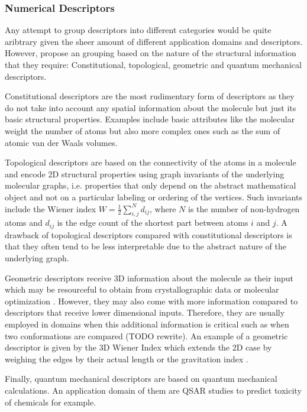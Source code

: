 \subsubsection{Numerical Descriptors}

Any attempt to group descriptors into different categories would be quite aribtrary given the sheer amount of different application domains and descriptors. However, \cite{descript} propose an grouping based on the nature of the structural information that they require: Constitutional, topological, geometric and quantum mechanical descriptors. 

Constitutional descriptors are the most rudimentary form of descriptors as they do not take into account any spatial information about the molecule but just its basic structural properties. Examples include basic attributes like the molecular weight the number of atoms but also more complex ones such as the sum of atomic van der Waals volumes. 

Topological descriptors are based on the connectivity of the atoms in a molecule and encode 2D structural properties using graph invariants of the underlying molecular graphs, i.e. properties that only depend on the abstract mathematical object and not on a particular labeling or ordering of the vertices. Such invariants include the Wiener index \cite{wiener1947structural, nikolic2001wiener} $W = \frac{1}{2} \sum_{i,j}^ N d_{ij}$, where $N$ is the number of non-hydrogen atoms and $d_{ij}$ is the edge count of the shortest part between atoms $i$ and $j$. A drawback of topological descriptors compared with constitutional descriptors is that they often tend to be less interpretable due to the abstract nature of the underlying graph. 

Geometric descriptors receive 3D information about the molecule as their input which may be resourceful to obtain from crystallographic data or molecular optimization \cite{Mauri2016}. However, they may also come with more information compared to descriptors that receive lower dimensional inputs. Therefore, they are usually employed in domains when this additional information is critical such as when two conformations are compared (TODO rewrite). An example of a geometric descriptor is given by the 3D Wiener Index which extends the 2D case by weighing the edges by their actual length or the gravitation index \cite{katritzky1996correlation}.

Finally, quantum mechanical descriptors are based on quantum mechanical calculations. An application domain of them are QSAR studies \citep{REENU201589, eroglu2007dft, senior2011qstr} to predict toxicity of chemicals for example.

